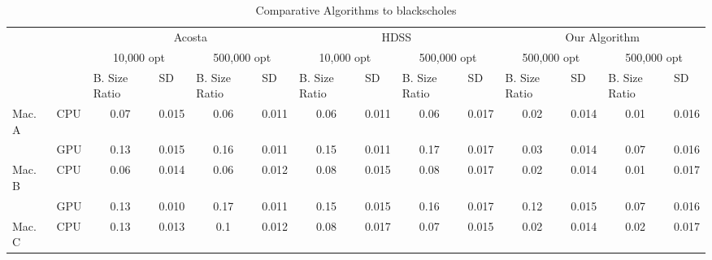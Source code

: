 \documentclass[journal]{IEEEtran}
\begin{document}
\begin{table}[htb]
\centering
\caption{Comparative Algorithms to blackscholes}
\begin{scriptsize}
\begin{tabular}{|l|l|l|l|l|l|l|l|l|l|l|l|l|l|}
\cline{3-14}
\multicolumn{1}{l}{} &  & \multicolumn{4}{c|}{Acosta} & \multicolumn{4}{c|}{HDSS} & \multicolumn{4}{c|}{Our Algorithm} \\ 
\cline{3-14}
\multicolumn{1}{l}{} &  & \multicolumn{2}{c|}{10,000 opt} & \multicolumn{2}{c|}{500,000 opt} & \multicolumn{2}{c|}{10,000 opt} & \multicolumn{2}{c|}{500,000 opt} & \multicolumn{2}{c|}{500,000 opt} & \multicolumn{2}{c|}{500,000 opt} \\ 
\cline{3-14}
\multicolumn{1}{l}{} &  & B. Size Ratio & SD & B. Size Ratio & SD & B. Size Ratio & SD & B. Size Ratio & SD & B. Size Ratio & SD & B. Size Ratio & SD \\ 
\hline
Mac. A & CPU & \multicolumn{1}{c|}{0.07} & \multicolumn{1}{c|}{0.015} & \multicolumn{1}{c|}{0.06} & \multicolumn{1}{c|}{0.011} & \multicolumn{1}{c|}{0.06} & \multicolumn{1}{c|}{0.011} & \multicolumn{1}{c|}{0.06} & \multicolumn{1}{c|}{0.017} & \multicolumn{1}{c|}{0.02} & \multicolumn{1}{c|}{0.014} & \multicolumn{1}{c|}{0.01} & \multicolumn{1}{c|}{0.016} \\ 
\cline{2-14}
 & GPU & \multicolumn{1}{c|}{0.13} & \multicolumn{1}{c|}{0.015} & \multicolumn{1}{c|}{0.16} & \multicolumn{1}{c|}{0.011} & \multicolumn{1}{c|}{0.15} & \multicolumn{1}{c|}{0.011} & \multicolumn{1}{c|}{0.17} & \multicolumn{1}{c|}{0.017} & \multicolumn{1}{c|}{0.03} & \multicolumn{1}{c|}{0.014} & \multicolumn{1}{c|}{0.07} & \multicolumn{1}{c|}{0.016} \\ 
\hline
Mac. B & CPU & \multicolumn{1}{c|}{0.06} & \multicolumn{1}{c|}{0.014} & \multicolumn{1}{c|}{0.06} & \multicolumn{1}{c|}{0.012} & \multicolumn{1}{c|}{0.08} & \multicolumn{1}{c|}{0.015} & \multicolumn{1}{c|}{0.08} & \multicolumn{1}{c|}{0.017} & \multicolumn{1}{c|}{0.02} & \multicolumn{1}{c|}{0.014} & \multicolumn{1}{c|}{0.01} & \multicolumn{1}{c|}{0.017} \\ 
\cline{2-14}
 & GPU & \multicolumn{1}{c|}{0.13} & \multicolumn{1}{c|}{0.010} & \multicolumn{1}{c|}{0.17} & \multicolumn{1}{c|}{0.011} & \multicolumn{1}{c|}{0.15} & \multicolumn{1}{c|}{0.015} & \multicolumn{1}{c|}{0.16} & \multicolumn{1}{c|}{0.017} & \multicolumn{1}{c|}{0.12} & \multicolumn{1}{c|}{0.015} & \multicolumn{1}{c|}{0.07} & \multicolumn{1}{c|}{0.016} \\ 
\hline
Mac. C & CPU & \multicolumn{1}{c|}{0.13} & \multicolumn{1}{c|}{0.013} & \multicolumn{1}{c|}{0.1} & \multicolumn{1}{c|}{0.012} & \multicolumn{1}{c|}{0.08} & \multicolumn{1}{c|}{0.017} & \multicolumn{1}{c|}{0.07} & \multicolumn{1}{c|}{0.015} & \multicolumn{1}{c|}{0.02} & \multicolumn{1}{c|}{0.014} & \multicolumn{1}{c|}{0.02} & \multicolumn{1}{c|}{0.017} \\ 

\end{tabular}
\end{scriptsize}
\end{table}
\end{document}

